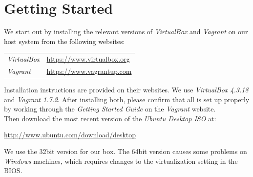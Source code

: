 


\vspace{-1cm}\doublespacing
\doublespacing

\section{Getting Started}
We start out by installing the relevant versions of \textit{VirtualBox} and \textit{Vagrant} on our host system from the following websites:
 
\begin{center}\begin{tabular}{ll}
\textit{VirtualBox} & \url{https://www.virtualbox.org}\\ 
\textit{Vagrant}    & \url{https://www.vagrantup.com}   
\end{tabular}\end{center}
 
Installation instructions are provided on their websites. We use \textit{VirtualBox 4.3.18} and \textit{Vagrant 1.7.2}. After installing both, please confirm that all is set up properly by working through the \textit{Getting Started Guide} on the \textit{Vagrant} website.\\\newline
%
Then download the most recent version of the \textit{Ubuntu Desktop ISO} at:
%
\begin{center}
\url{http://www.ubuntu.com/download/desktop}
\end{center}
%
We use the 32bit version for our box. The 64bit version causes some problems on \textit{Windows} machines, which requires changes to the virtualization setting in the BIOS.
